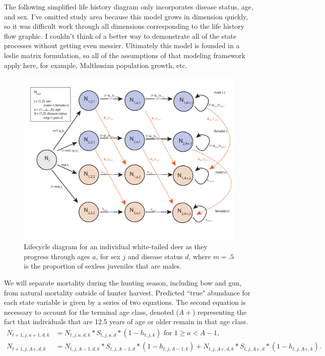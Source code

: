 \documentclass[12pt]{article}\usepackage[]{graphicx}\usepackage[]{color}
\begin{document}
The following simplified life history diagram only incorporates disease status, age, and sex. I've omitted study area because this model grows in dimension quickly, so it was difficult work through all dimensions corresponding to the life history flow graphic. I couldn't think of a better way to demonstrate all of the state processes without getting even messier. Ultimately this model is founded in a leslie matrix formulation, so all of the assumptions of that modeling framework apply here, for example, Malthusian population growth, etc. 

\begin{figure}[H]
\begin{center}
\includegraphics[width=6.5 in]{IPM_lifecycle}
\caption{Lifecycle diagram for an individual white-tailed deer as they progress through ages $a$, for sex $j$ and disease status $d$, where $m=.5$ is the proportion of sexless juveniles that are males.}\label{fig:Lifecylce}
\end{center}
\end{figure}

We will separate mortality during the hunting season, including bow and gun, from natural mortality outside of hunter harvest. Predicted ``true" abundance for each state variable is given by a series of two equations. The second equation is necessary to account for the terminal age class, denoted ($A+$) representing the fact that individuals that are 12.5 years of age or older remain in that age class.
\begin{align}
N_{t+1,j,a+1,d,k} & = N_{t,j,a,d,k}*S_{t,j,a,d}*(1-h_{t,j,k}) \text{ for } 1 \geq a < A-1,\\
N_{t+1,j,A+,d,k} & = N_{t,j,A-1,d,k}*S_{t,j,A-1,d}*(1-h_{t,j,A-1,k}) + N_{t,j,A+,d,k}*S_{t,j,A+,d}*(1-h_{t,j,A+,k}). 
\end{align}
\end{document}
